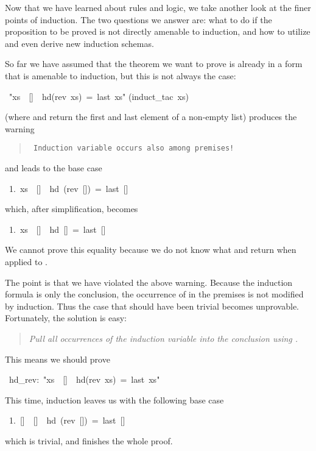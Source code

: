 \begin{isabelle}%
%
\begin{isamarkuptext}%
\noindent
Now that we have learned about rules and logic, we take another look at the
finer points of induction. The two questions we answer are: what to do if the
proposition to be proved is not directly amenable to induction, and how to
utilize and even derive new induction schemas.%
\end{isamarkuptext}%
%
%
\begin{isamarkuptext}%
\noindent
So far we have assumed that the theorem we want to prove is already in a form
that is amenable to induction, but this is not always the case:%
\end{isamarkuptext}%
\ {"}xs\ {\isasymnoteq}\ []\ {\isasymLongrightarrow}\ hd(rev\ xs)\ =\ last\ xs{"}\isanewline
{}(induct\_tac\ xs)%
\begin{isamarkuptxt}%
\noindent
(where  and  return the first and last element of a
non-empty list)
produces the warning
\begin{quote}\tt
Induction variable occurs also among premises!
\end{quote}
and leads to the base case
\begin{isabellepar}%
\ 1.\ xs\ {\isasymnoteq}\ []\ {\isasymLongrightarrow}\ hd\ (rev\ [])\ =\ last\ []
\end{isabellepar}%
which, after simplification, becomes
\begin{isabellepar}%
\ 1.\ xs\ {\isasymnoteq}\ []\ {\isasymLongrightarrow}\ hd\ []\ =\ last\ []
\end{isabellepar}%
We cannot prove this equality because we do not know what  and
 return when applied to \isa{[]}.

The point is that we have violated the above warning. Because the induction
formula is only the conclusion, the occurrence of  in the premises is
not modified by induction. Thus the case that should have been trivial
becomes unprovable. Fortunately, the solution is easy:
\begin{quote}
\emph{Pull all occurrences of the induction variable into the conclusion
using \isa{\isasymlongrightarrow}.}
\end{quote}
This means we should prove%
\end{isamarkuptxt}%
\ hd\_rev:\ {"}xs\ {\isasymnoteq}\ []\ {\isasymlongrightarrow}\ hd(rev\ xs)\ =\ last\ xs{"}%
\begin{isamarkuptext}%
\noindent
This time, induction leaves us with the following base case
\begin{isabellepar}%
\ 1.\ []\ {\isasymnoteq}\ []\ {\isasymlongrightarrow}\ hd\ (rev\ [])\ =\ last\ []
\end{isabellepar}%
which is trivial, and  finishes the whole proof.


\end{isamarkuptext}
\end{isabelle}
